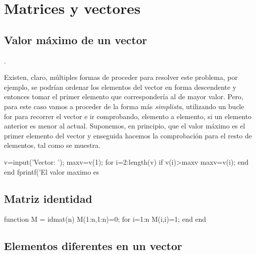 \chapter{Matrices y vectores}

\section{Valor máximo de un vector}

.

\sol

Existen, claro, múltiples formas de proceder para resolver este problema, por ejemplo, se podrían 
ordenar los elementos del vector en forma descendente y entonces tomar el primer elemento que 
correspondería al de mayor valor. Pero, para este caso vamos a proceder de la forma más \textit{simplista}, 
utilizando un bucle for para recorrer el vector e ir comprobando, elemento a elemento, si un elemento 
anterior es menor al actual. Suponemos, en principio, que el valor máximo es el primer elemento del vector 
y enseguida hacemos la comprobación para el resto de elementos, tal como se muestra.

\begin{matlab}
v=input('Vector: ');
maxv=v(1);
for i=2:length(v)
    if v(i)>maxv
        maxv=v(i);
    end
end
fprintf('El valor maximo es %
\end{matlab}

\section{Matriz identidad}


\sol

\begin{matlab}
function M = idmat(n)
M(1:n,1:n)=0;
for i=1:n
    M(i,i)=1;
end
end
\end{matlab}


\section{Elementos diferentes en un vector}

